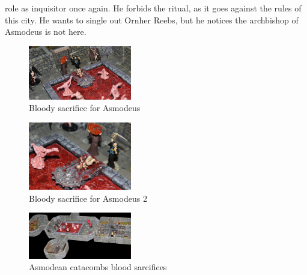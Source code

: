 role as inquisitor once again. He forbids the ritual, as it goes against the rules of this city. He wants to single out Ornher Reebs, but he notices the archbishop of Asmodeus is not here. \\

\begin{figure}[h]
	\centering
	\includegraphics[width=0.4\textwidth]{images/Bloody-sacrifice-for-Asmodeus-616078986_mod.jpg}
	\caption{Bloody sacrifice for Asmodeus}
	\label{fig:Bloody-sacrifice-for-Asmodeus-616078986}
\end{figure}

\begin{figure}[h]
	\centering
	\includegraphics[width=0.4\textwidth]{images/Bloody-sacrifice-for-Asmodeus-2-616080218_mod.jpg}
	\caption{Bloody sacrifice for Asmodeus 2}
	\label{fig:Bloody-sacrifice-for-Asmodeus-2-616080218}
\end{figure}

\begin{figure}[h]
	\centering
	\includegraphics[width=0.4\textwidth]{images/Asmodean-catacombs-blood-sarcifices-616082201_mod.jpg}
	\caption{Asmodean catacombs blood sarcifices}
	\label{fig:Asmodean-catacombs-blood-sarcifices-616082201}
\end{figure}

